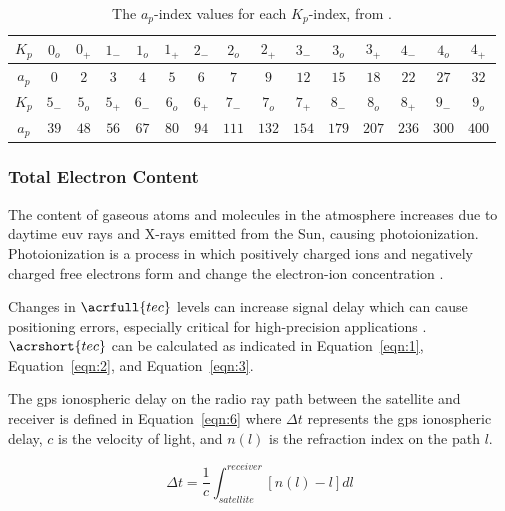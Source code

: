 \documentclass[sn-mathphys-num]{sn-jnl}%
\begin{document}
\begin{table}[!ht]
    \centering
    \caption{The $a_{p}$-index values for each $K_{p}$-index, from \cite{NOAA2024gGeomagneticIndices}.}
    \label{tab:ap}
    \begin{tabular}{|c|c|c|c|c|c|c|c|c|c|c|c|c|c|c|}
        \hline
        $K_{p}$ & $0_{o}$ & $0_{+}$ & $1_{-}$ & $1_{o}$ & $1_{+}$ & $2_{-}$ & $2_{o}$ & $2_{+}$ & $3_{-}$ & $3_{o}$ & $3_{+}$ & $4_{-}$ & $4_{o}$ & $4_{+}$ \\ \hline
        $a_{p}$ & $0$ & $2$ & $3$ & $4$ & $5$ & $6$ & $7$ & $9$ & $12$ & $15$ & $18$ & $22$ & $27$ & $32$ \\ \hline
        $K_{p}$ & $5_{-}$ & $5_{o}$ & $5_{+}$ & $6_{-}$ & $6_{o}$ & $6_{+}$ & $7_{-}$ & $7_{o}$ & $7_{+}$ & $8_{-}$ & $8_{o}$ & $8_{+}$ & $9_{-}$ & $9_{o}$ \\ \hline
        $a_{p}$ & $39$ & $48$ & $56$ & $67$ & $80$ & $94$ & $111$ & $132$ & $154$ & $179$ & $207$ & $236$ & $300$ & $400$ \\ \hline
 \end{tabular}
\end{table}

\subsubsection{Total Electron Content}

The content of gaseous atoms and molecules in the atmosphere increases due to daytime \acrfull{euv} rays and X-rays emitted from the Sun, causing photoionization. Photoionization is a process in which positively charged ions and negatively charged free electrons form and change the electron-ion concentration \cite{prolss2012physics}.

Changes in $\acrfull{tec}$ levels \cite{liu2009seismoionospheric} can increase signal delay which can cause positioning errors, especially critical for high-precision applications \cite{durmaz2015regional, jin2012m_dcb}. $\acrshort{tec}$ can be calculated as indicated in Equation~\ref{eqn:1}, Equation~\ref{eqn:2}, and Equation~\ref{eqn:3}. 

The \acrfull{gps} ionospheric delay \cite{schaer1999mapping} on the radio ray path between the satellite and receiver is defined in Equation~\ref{eqn:6} \cite{spilker1996global} where $\Delta t$ represents the \acrshort{gps} ionospheric delay, $c$ is the velocity of light, and $n(l)$ is the refraction index on the path $l$.

\begin{equation}
	\Delta t = \frac{1}{c} \int_{satellite}^{receiver} \left[ n(l) - l \right]dl
	\label{eqn:6}
\end{equation}
\end{document}
